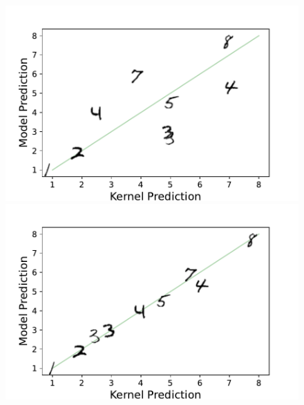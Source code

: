 \begin{figure}[!h]
    \centering
    \includegraphics[width=0.95\linewidth]{c4_figures/mnist_model_kernel_compare_1_step.pdf}

    \vspace{-9mm}
    
    \includegraphics[width=0.95\linewidth]{c4_figures/mnist_model_kernel_compare_10_steps.pdf}
    
    \vspace{-9mm}
    

\end{figure}
